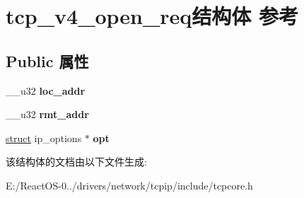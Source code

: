 \hypertarget{structtcp__v4__open__req}{}\section{tcp\+\_\+v4\+\_\+open\+\_\+req结构体 参考}
\label{structtcp__v4__open__req}
\subsection*{Public 属性}
\begin{DoxyCompactItemize}
\item 
\mbox{\label{structtcp__v4__open__req_a0cc3a3409630fca2de32c75dab6ef6f0}} 
\+\_\+\+\_\+u32 {\bfseries loc\+\_\+addr}
\item 
\mbox{\label{structtcp__v4__open__req_a55c3f0d0481099e3410a6be7d80ba8de}} 
\+\_\+\+\_\+u32 {\bfseries rmt\+\_\+addr}
\item 
\mbox{\label{structtcp__v4__open__req_a2c8e81a623adf59e1d01c93237d0567c}} 
\hyperlink{interfacestruct}{struct} ip\+\_\+options $\ast$ {\bfseries opt}
\end{DoxyCompactItemize}


该结构体的文档由以下文件生成\+:\begin{DoxyCompactItemize}
\item 
E\+:/\+React\+O\+S-\/0../drivers/network/tcpip/include/tcpcore.\+h\end{DoxyCompactItemize}
